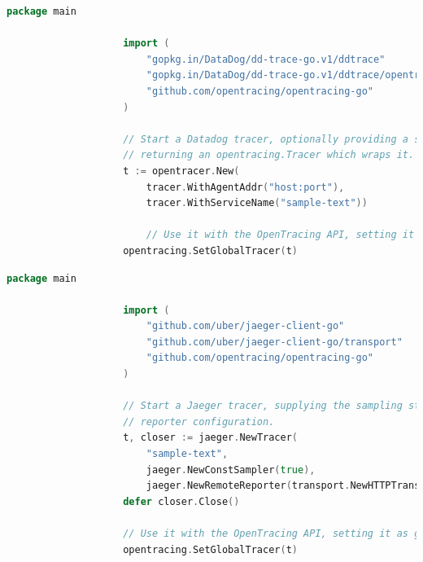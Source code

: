\documentclass[12pt,pdftex,titlepage]{report}
\begin{document}
                \medskip
                \begin{lstlisting}[caption=Example Golang snippet of instatiating a Datadog OpenTracing compatible tracer., language=Go, gobble=20]
                    package main

                    import (
                        "gopkg.in/DataDog/dd-trace-go.v1/ddtrace"
                        "gopkg.in/DataDog/dd-trace-go.v1/ddtrace/opentracer"
                        "github.com/opentracing/opentracing-go"
                    )

                    // Start a Datadog tracer, optionally providing a set of options,
                    // returning an opentracing.Tracer which wraps it.
                    t := opentracer.New(
                        tracer.WithAgentAddr("host:port"),
                        tracer.WithServiceName("sample-text"))

                        // Use it with the OpenTracing API, setting it as global.
                    opentracing.SetGlobalTracer(t)
                \end{lstlisting}

                \newpage
                \begin{lstlisting}[caption=Example Golang snippet of instatiating a Jaeger OpenTracing compatible tracer., language=Go, gobble=20]
                    package main

                    import (
                        "github.com/uber/jaeger-client-go"
                        "github.com/uber/jaeger-client-go/transport"
                        "github.com/opentracing/opentracing-go"
                    )

                    // Start a Jaeger tracer, supplying the sampling strategy and the
                    // reporter configuration.
                    t, closer := jaeger.NewTracer(
                        "sample-text",
                        jaeger.NewConstSampler(true),
                        jaeger.NewRemoteReporter(transport.NewHTTPTransport("host:port")))
                    defer closer.Close()

                    // Use it with the OpenTracing API, setting it as global.
                    opentracing.SetGlobalTracer(t)                    
                \end{lstlisting}
\end{document}
